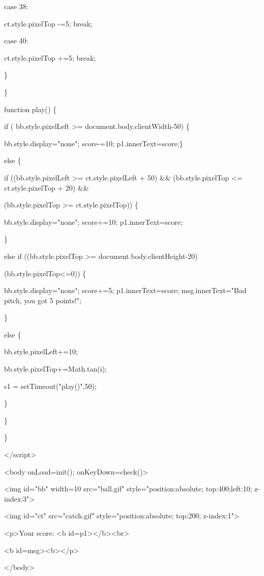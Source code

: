 \documentclass[
]{article}
\begin{document}
case 38:

ct.style.pixelTop -=5; break;

case 40:

ct.style.pixelTop +=5; break;

\}

\}

function play() \{

if ( bb.style.pixelLeft \textgreater= document.body.clientWidth-50) \{

bb.style.display="none"; score-=10; p1.innerText=score;\}

else \{

if ((bb.style.pixelLeft \textgreater= ct.style.pixelLeft + 50) \&\&
(bb.style.pixelTop \textless= ct.style.pixelTop + 20) \&\&

(bb.style.pixelTop \textgreater= ct.style.pixelTop)) \{

bb.style.display="none"; score+=10; p1.innerText=score;

\}

else if ((bb.style.pixelTop \textgreater= document.body.clientHeight-20)
\textbar\textbar{}

(bb.style.pixelTop\textless=0)) \{

bb.style.display="none"; score+=5; p1.innerText=score;
msg.innerText="Bad pitch, you got 5 points!";

\}

else \{

bb.style.pixelLeft+=10;

bb.style.pixelTop+=Math.tan(i);

s1 = setTimeout("play()",50);

\}

\}

\}

\textless/script\textgreater{}

\textless body onLoad=init(); onKeyDown=check()\textgreater{}

\textless img id="bb" width=10 src="ball.gif" style="position:absolute;
top:400;left:10; z-index:3"\textgreater{}

\textless img id="ct" src="catch.gif" style="position:absolute; top:200;
z-index:1"\textgreater{}

\textless p\textgreater Your score: \textless b
id=p1\textgreater\textless/b\textgreater\textless br\textgreater{}

\textless b
id=msg\textgreater\textless b\textgreater\textless/p\textgreater{}

\textless/body\textgreater{}
\end{document}
